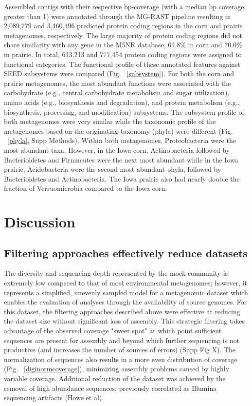 \documentclass[11pt]{article} %
\begin{document}
Assembled contigs with their respective bp-coverage (with a median bp coverage greater than 1) were annotated through the MG-RAST pipeline resulting in 2,089,779 and  3,460,496 predicted protein coding regions in the corn and prairie metagenomes, respectively.  The large majority of protein coding regions did not share similarity with any gene in the M5NR database, 61.8\% in corn and 70.0\% in prairie.  In total, 613,213 and 777,454 protein coding regions were assigned to functional categories.  The functional profile of these annotated features against SEED subsystems were compared (Fig. ~\ref{subsystem}).  For both the corn and prairie metagenomes, the most abundant functions were associated with the carbohydrate (e.g., central carbohydrate metabolism and sugar utilization), amino acids (e.g., biosynthesis and degradation), and protein metabolism (e.g., biosynthesis, processing, and modification) subsystems.  The subsystem profile of both metagenomes were very similar while the taxonomic profile of the metagenomes based on the originating taxonomy (phyla) were different (Fig. ~\ref{phyla}, Supp Methods).  Within both metagenomes, Proteobacteria were the most abundant taxa.  However, in the Iowa corn, Actinobacteria followed by Bacterioidetes and Firmucutes were the next most abundant while in the Iowa prairie, Acidobacteria were the second most abundant phyla, followed by Bacterioidetes  and Actinobacteria.  The Iowa prairie also had nearly double the fraction of Verruomicrobia compared to the Iowa corn.  


\section{Discussion}

\subsection{Filtering approaches effectively reduce datasets} 

The diversity and sequencing depth represented by the mock community is extremely low compared to that of most environmental metagenomes; however, it represents a simplified, unevenly sampled model for a metagenomic dataset which enables the evaluation of analyses through the availability of source genomes.  For this dataset, the filtering approaches described above were effective at reducing the dataset size without significant loss of assembly.  This strategic filtering takes advantage of the observed coverage "sweet spot" at which point sufficient sequences are present for assembly and beyond which further sequencing is not productive (and increases the number of sources of errors) (Supp Fig X).    The normalization of sequences also results in a more even distribution of coverage (Fig. ~\ref{diginormcoverage}), minimizing assembly problems caused by highly variable coverage.  Additional reduction of the dataset was achieved by the removal of high abundance sequences, previously correlated as Illumina sequencing artifacts (Howe et al).  
\end{document}
